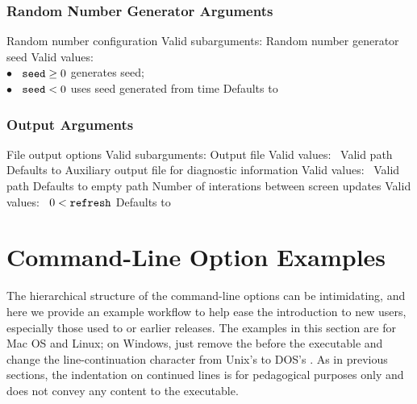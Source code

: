 \subsubsection{Random Number Generator Arguments}

\begin{description}

  {Random number configuration}
  {Valid subarguments: }
%
    {Random number generator seed}
    {Valid values: \\
      \hspace*{8pt} $\bullet$ \ $\mbox{\code{seed}} \geq 0$ generates seed; 
      \\
      \hspace*{8pt} $\bullet$ \ $\mbox{\code{seed}} < 0$ uses seed generated from time}
    {Defaults to }
%
\end{description}

\subsubsection{Output Arguments}

\begin{description}
  {File output options}
  {Valid subarguments: }
%
    {Output file}
    {Valid values: \  Valid path}
    {Defaults to }
%
    {Auxiliary output file for diagnostic information}
    {Valid values: \  Valid path}
    {Defaults to empty path}
%
    {Number of interations between screen updates}
    {Valid values: \  $0 < \mbox{\code{refresh}}$}
    {Defaults to }
%
\end{description}

\section{Command-Line Option Examples}

The hierarchical structure of the command-line options can be
intimidating, and here we provide an example workflow to help ease the
introduction to new users, especially those used to  or
earlier releases.  The examples in this section are for Mac OS and
Linux; on Windows, just remove the  before the executable and
change the line-continuation character from Unix's
\code{\textbackslash} to DOS's \code{\textasciicircum}.  As in
previous sections, the indentation on continued lines is for
pedagogical purposes only and does not convey any content to the
executable.

